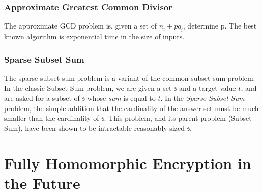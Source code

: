 \documentclass[a4paper,10pt]{article}
\begin{document}
\subsubsection{Approximate Greatest Common Divisor}
The approximate GCD problem is, given a set of $ n _{i} + pq_{i} $,
determine p. The best known algorithm is exponential time in the size
of inputs.


\subsubsection{Sparse Subset Sum}
The sparse subset sum problem is a variant of the common subset sum
problem. In the classic Subset Sum problem, we are given a set $
\mathbb{s} $ and a target value $t$, and are asked for a subset of $
\mathbb{s} $ whose \textit{sum} is equal to $t$. In the \textit{Sparse
  Subset Sum} problem, the simple addition that the cardinality of the
answer set must be much smaller than the cardinality of $ \mathbb{s}
$. This problem, and its parent problem (Subset Sum), have been shown
to be intractable reasonably sized $ \mathbb{s} $.

\section{Fully Homomorphic Encryption in the Future}

\pagebreak

\end{document}
